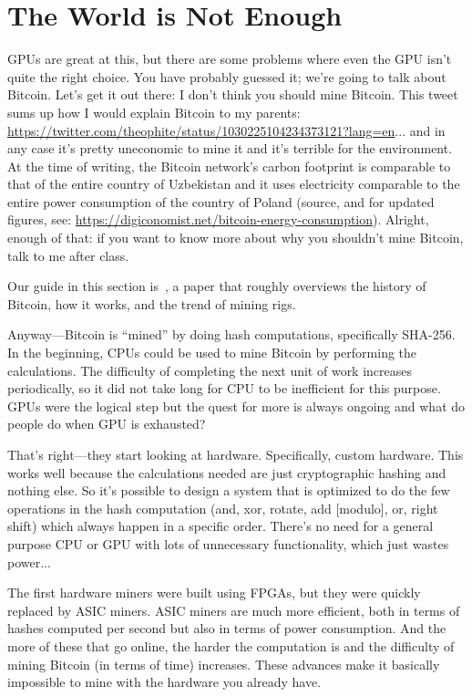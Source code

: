 \section*{The World is Not Enough}
GPUs are great at this, but there are some problems where even the GPU isn't quite the right choice. You have probably guessed it; we're going to talk about Bitcoin. Let's get it out there: I don't think you should mine Bitcoin. This tweet sums up how I would explain Bitcoin to my parents: \url{https://twitter.com/theophite/status/1030225104234373121?lang=en}... and in any case it's pretty uneconomic to mine it and it's terrible for the environment. At the time of writing, the Bitcoin network's carbon footprint is comparable to that of the entire country of Uzbekistan and it uses electricity comparable to the entire power consumption of the country of Poland (source, and for updated figures, see: \url{https://digiconomist.net/bitcoin-energy-consumption}). Alright, enough of that: if you want to know more about why you shouldn't mine Bitcoin, talk to me after class. 

Our guide in this section is~\cite{bitcoin}, a paper that roughly overviews the history of Bitcoin, how it works, and the trend of mining rigs. 

Anyway---Bitcoin is ``mined'' by doing hash computations, specifically SHA-256. In the beginning, CPUs could be used to mine Bitcoin by performing the calculations. The difficulty of completing the next unit of work increases periodically, so it did not take long for CPU to be inefficient for this purpose. GPUs were the logical step but the quest for more is always ongoing and what do people do when GPU is exhausted?

That's right---they start looking at hardware. Specifically, custom hardware. This works well because the calculations needed are just cryptographic hashing and nothing else. So it's possible to design a system that is optimized to do the few operations in the hash computation (and, xor, rotate, add [modulo], or, right shift) which always happen in a specific order. There's no need for a general purpose CPU or GPU with lots of unnecessary functionality, which just wastes power...

 The first hardware miners were built using FPGAs, but they were quickly replaced by ASIC miners. ASIC miners are much more efficient, both in terms of hashes computed per second but also in terms of power consumption. And the more of these that go online, the harder the computation is and the difficulty of mining Bitcoin (in terms of time) increases. These advances make it basically impossible to mine with the hardware you already have.

